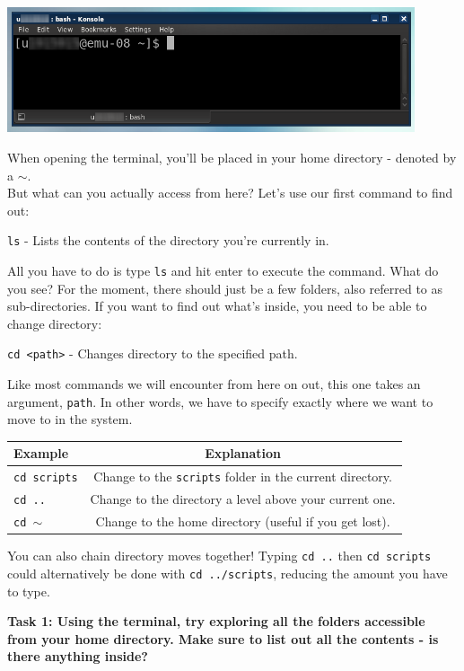 \documentclass[a4paper,11pt,parskip=half-]{scrartcl}
\begin{document}
\centering \includegraphics[width=0.9\textwidth]{terminal.png}

\raggedright


When opening the terminal, you'll be placed in your home directory - denoted by a $\sim$. \\ 
But what can you actually access from here? Let's use our first command to find out:

\Large \texttt{ls} \normalsize - Lists the contents of the directory you're currently in.

All you have to do is type \texttt{ls} and hit enter to execute the command. 
What do you see? 
For the moment, there should just be a few folders, also referred to as sub-directories. 
If you want to find out what's inside, you need to be able to change directory:

\Large \texttt{cd <path>} \normalsize - Changes directory to the specified path.

Like most commands we will encounter from here on out, this one takes an argument, \texttt{path}. 
In other words, we have to specify exactly where we want to move to in the system.

\centering
\begin{tabular}{l|c}
    Example & Explanation \\
    \hline
    \Large \texttt{cd scripts} \normalfont & Change to the \texttt{scripts} folder in the current directory.  \\
    \Large \texttt{cd ..} \normalfont & Change to the directory a level above your current one. \\
    \Large \texttt{cd $\sim$} \normalfont & Change to the home directory (useful if you get lost).
\end{tabular}

\raggedright

You can also chain directory moves together! 
Typing \texttt{cd ..} then \texttt{cd scripts} could alternatively be done with \texttt{cd ../scripts}, reducing the amount you have to type.

\bfseries Task 1: \normalfont 
Using the terminal, try exploring all the folders accessible from your home directory. 
Make sure to list out all the contents - is there anything inside? 
\end{document}
